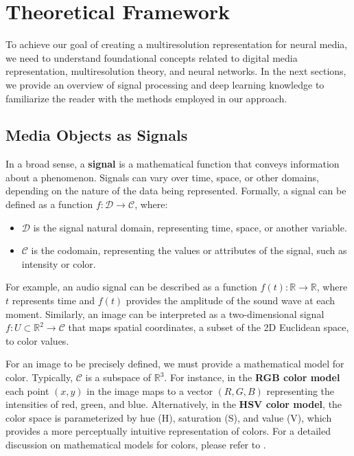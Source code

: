 \chapter{Theoretical Framework}

To achieve our goal of creating a multiresolution representation for neural media, we need to understand foundational concepts related to digital media representation, multiresolution theory, and neural networks. In the next sections, we provide an overview of signal processing and deep learning knowledge to familiarize the reader with the methods employed in our approach.


\section{Media Objects as Signals}

In a broad sense, a \textbf{signal} is a mathematical function that conveys information about a phenomenon. Signals can vary over time, space, or other domains, depending on the nature of the data being represented. Formally, a signal can be defined as a function \( f: \mathcal{D} \to \mathcal{C} \), where:

\begin{itemize}
  \item \( \mathcal{D} \) is the signal natural domain, representing time, space, or another variable.
  \item \( \mathcal{C} \) is the codomain, representing the values or attributes of the signal, such as intensity or color.
\end{itemize}

For example, an audio signal can be described as a function \( f(t): \mathbb{R} \to \mathbb{R} \), where \( t \) represents time and \( f(t) \) provides the amplitude of the sound wave at each moment. Similarly, an image can be interpreted as a two-dimensional signal \( f: U \subset \mathbb{R}^2 \to \mathcal{C} \) that maps spatial coordinates, a subset of the 2D Euclidean space, to color values. 

For an image to be precisely defined, we must provide a mathematical model for color. Typically, $\mathcal{C}$ is a subspace of $\mathbb{R}^3$. For instance, in the \textbf{RGB color model} each point \( (x, y) \) in the image maps to a vector \( (R, G, B) \) representing the intensities of red, green, and blue. Alternatively, in the \textbf{HSV color model}, the color space is parameterized by hue (H), saturation (S), and value (V), which provides a more perceptually intuitive representation of colors. For a detailed discussion on mathematical models for colors, please refer to \cite{ipcgVelho2014}.

